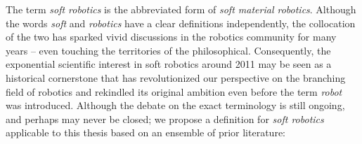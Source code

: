The term \emph{soft robotics} is the abbreviated form of \emph{soft material robotics}. Although the words \emph{soft} and \emph{robotics} have a clear definitions independently, the collocation of the two has sparked vivid discussions in the robotics community for many years -- even touching the territories of the philosophical. Consequently, the exponential scientific interest in soft robotics around 2011 may be seen as a historical cornerstone that has revolutionized our perspective on the branching field of robotics and rekindled its original ambition even before the term \emph{robot} was introduced. Although the debate on the exact terminology is still ongoing, and perhaps may never be closed; we propose a definition for \emph{soft robotics} applicable to this thesis based on an ensemble of prior literature:


